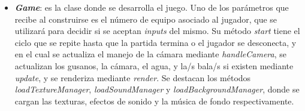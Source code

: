 \begin{itemize}
	\item \textbf{\textit{Game}}: es la clase donde se desarrolla el juego. Uno de los parámetros que recibe al construirse es el número de equipo asociado al jugador, que se utilizará para decidir si se aceptan \textit{inputs} del mismo. Su método \textit{start} tiene el ciclo que se repite hasta que la partida termina o el jugador se desconecta, y en el cual se actualiza el manejo de la cámara mediante \textit{handleCamera}, se actualizan los gusanos, la cámara, el agua, y la/s bala/s si existen mediante \textit{update}, y se renderiza mediante \textit{render}. Se destacan los métodos \textit{loadTextureManager}, \textit{loadSoundManager} y \textit{loadBackgroundManager}, donde se cargan las texturas, efectos de sonido y la música de fondo respectivamente.
\end{itemize}
